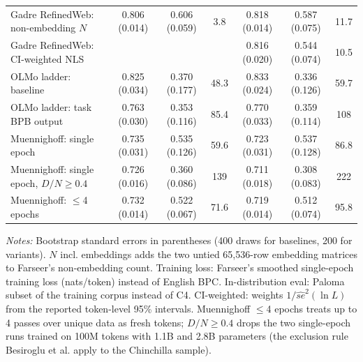 \begin{table}[!htbp]
\begin{threeparttable}
\begin{tabular}{lcccccc}
Gadre RefinedWeb: non-embedding $N$ & 0.806 (0.014) & 0.606 (0.059) & 3.8 & 0.818 (0.014) & 0.587 (0.075) & 11.7 \\
Gadre RefinedWeb: CI-weighted NLS &  &  &  & 0.816 (0.020) & 0.544 (0.074) & 10.5 \\
OLMo ladder: baseline & 0.825 (0.034) & 0.370 (0.177) & 48.3 & 0.833 (0.024) & 0.336 (0.126) & 59.7 \\
OLMo ladder: task BPB output & 0.763 (0.030) & 0.353 (0.116) & 85.4 & 0.770 (0.033) & 0.359 (0.114) & 108 \\
Muennighoff: single epoch & 0.735 (0.031) & 0.535 (0.126) & 59.6 & 0.723 (0.031) & 0.537 (0.128) & 86.8 \\
Muennighoff: single epoch, $D/N\geq0.4$ & 0.726 (0.016) & 0.360 (0.086) & 139 & 0.711 (0.018) & 0.308 (0.083) & 222 \\
Muennighoff: $\leq$4 epochs & 0.732 (0.014) & 0.522 (0.067) & 71.6 & 0.719 (0.014) & 0.512 (0.074) & 95.8 \\
\bottomrule
\end{tabular}
\begin{tablenotes}[flushleft]
\footnotesize
\item \textit{Notes:} Bootstrap standard errors in parentheses (400 draws for baselines, 200 for variants). $N$ incl. embeddings adds the two untied 65,536-row embedding matrices to Farseer's non-embedding count. Training loss: Farseer's smoothed single-epoch training loss (nats/token) instead of English BPC. In-distribution eval: Paloma subset of the training corpus instead of C4. CI-weighted: weights $1/\widehat{se}^2(\ln L)$ from the reported token-level 95\% intervals. Muennighoff $\leq$4 epochs treats up to 4 passes over unique data as fresh tokens; $D/N\geq0.4$ drops the two single-epoch runs trained on 100M tokens with 1.1B and 2.8B parameters (the exclusion rule Besiroglu et al. apply to the Chinchilla sample).
\end{tablenotes}
\end{threeparttable}
\end{table}
